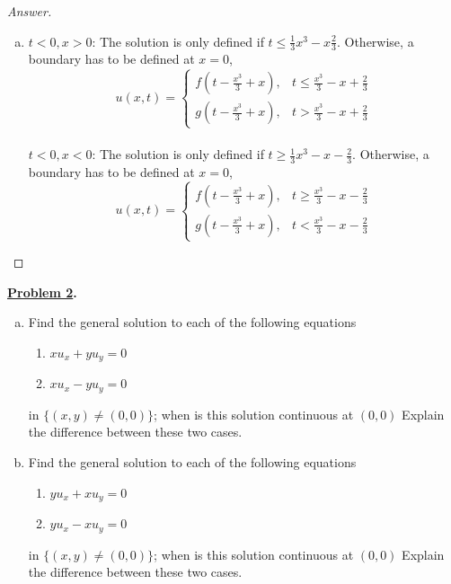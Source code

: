 \documentclass{article}
\theoremstyle{definition}
\renewcommand\qedsymbol{$\blacksquare$}
\newenvironment{ans}{\begin{proof}[Answer]\renewcommand{\qedsymbol}{}}{\end{proof}}
\newenvironment{boldenv}{\bfseries\boldmath}{}
\begin{document}
\begin{ans}
\begin{enumerate}[(1), series=answers]
\begin{enumerate}[a)]
                    \item \underline{$t < 0, x > 0$}: The solution is only defined if $t \leq \frac{1}{3}x^3 - x  \frac{2}{3}$. Otherwise, a boundary has to be defined at $x = 0$,
                    \begin{equation*}
                    u(x,t) =
                    \begin{cases}
                        f\left(t - \frac{x^3}{3} + x\right), & t \leq \frac{x^3}{3} - x + \frac{2}{3}\\
                        g\left(t - \frac{x^3}{3} + x\right), & t > \frac{x^3}{3} - x + \frac{2}{3}
                    \end{cases}
                    \end{equation*}\\
                    \underline{$t < 0, x < 0$}: The solution is only defined if $t \geq \frac{1}{3}x^3 - x - \frac{2}{3}$. Otherwise, a boundary has to be defined at $x = 0$,
                    \begin{equation*}
                    u(x,t) =
                    \begin{cases}
                        f\left(t - \frac{x^3}{3} + x\right), & t \geq \frac{x^3}{3} - x - \frac{2}{3}\\
                        g\left(t - \frac{x^3}{3} + x\right), & t < \frac{x^3}{3} - x - \frac{2}{3}
                    \end{cases}
                    \end{equation*}
                \end{enumerate}
		\end{enumerate}
		
	\end{ans}
	\begin{boldenv}
		\underline{Problem 2}. \begin{enumerate}[a)]
		    \item Find the general solution to each of the following equations
      \begin{enumerate}[start=14, resume*=problems]
			\item $xu_x + yu_y = 0$
            \item $xu_x - yu_y = 0$
		\end{enumerate}
        in $\{(x,y)\neq (0,0)\}$; when is this solution continuous at $(0,0)$ Explain the difference between these two cases.

        \item Find the general solution to each of the following equations
      \begin{enumerate}[start=16, resume*=problems]
			\item $yu_x + xu_y = 0$
            \item $yu_x - xu_y = 0$
		\end{enumerate}
        in $\{(x,y)\neq (0,0)\}$; when is this solution continuous at $(0,0)$ Explain the difference between these two cases.
		\end{enumerate}
	\end{boldenv}
	
\end{document}
